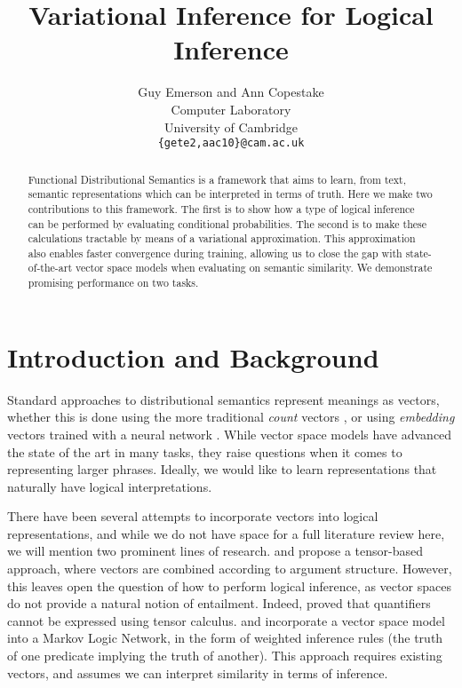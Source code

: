\documentclass[11pt]{article}
\title{Variational Inference for Logical Inference}
\author{Guy Emerson and Ann Copestake \\
  Computer Laboratory \\
  University of Cambridge \\
  {\tt \{gete2,aac10\}@cam.ac.uk} \\
}
\date{}
\begin{document}
\maketitle
\begin{abstract}
Functional Distributional Semantics
is a framework that aims to learn, from text,
semantic representations which can be interpreted in terms of truth.
Here we make two contributions to this framework.
The first is to show how a type of logical inference can be performed
by evaluating conditional probabilities.
The second is to make these calculations tractable
by means of a variational approximation.
This approximation also enables faster convergence during training,
allowing us to close the gap with state-of-the-art vector space models
when evaluating on semantic similarity.
We demonstrate promising performance on two tasks.
\end{abstract}

\section{Introduction and Background}

Standard approaches to distributional semantics
represent meanings as vectors,
whether this is done using the more traditional \textit{count} vectors
\cite{turney2010vector},
or using \textit{embedding} vectors trained with a neural network
\cite{mikolov2013vector}.
While vector space models have advanced the state of the art in many tasks,
they raise questions when it comes to representing larger phrases.
Ideally, we would like to learn representations
that naturally have logical interpretations.

There have been several attempts to incorporate vectors into logical representations,
and while we do not have space for a full literature review here,
we will mention two prominent lines of research.
 and 
propose a tensor-based approach,
where vectors are combined according to argument structure.
However, this leaves open the question of how to perform logical inference,
as vector spaces do not provide a natural notion of entailment.
Indeed,  proved that
quantifiers cannot be expressed using tensor calculus.
 and 
incorporate a vector space model into a Markov Logic Network,
in the form of weighted inference rules
(the truth of one predicate implying the truth of another).
This approach requires existing vectors,
and assumes we can interpret similarity in terms of inference.
\end{document}
